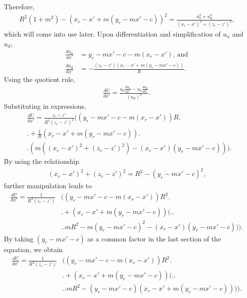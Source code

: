 Therefore,
\begin{align}\label{eqn:unsqplusudsq}
    R^2\left(1+m^2\right)-\left(x_r-x'+m\left(y_r-mx'-c\right)\right)^2 = \frac{u_n^2+u_d^2}{\left(x_r-x'\right)^2+\left(z_r-z'\right)^2} \text{,}
\end{align}
which will come into use later. Upon differentiation and simplification of \(u_n\) and \(u_d\),
\begin{align}
    \frac{du_n}{dx'} &= y_r - mx' - c - m\left(x_r-x'\right) \text{, and} \nonumber \\
    \frac{du_d}{dx'} &= -\frac{\left(z_r-z'\right)\left(x_r-x' + m\left(y_r-mx'-c\right)\right)}{R} \text{.}
\end{align}
Using the quotient rule,
\begin{align}
    \frac{dU}{dx'} = \frac{u_d\frac{du_n}{dx'} - u_n\frac{du_d}{dx'}}{\left(u_d\right)^2} \text{.}
\end{align}
Substituting in expressions,
\begin{align}
    &\frac{dU}{dx'} = \frac{z_r-z'}{R^2\left(z_r-z'\right)^2} \bigg(  \left(y_r-mx'-c-m\left(x_r-x'\right)\right)R \bigg. \nonumber \\
    & \bigg. +\frac{1}{R} \left( x_r - x' + m\left(y_r-mx'-c\right)\right)\bigg. \nonumber \\
    & \bigg. \left(m\left(\left(x_r-x'\right)^2 + \left(z_r-z'\right)^2\right) - \left(x_r-x'\right)\left(y_r-mx'-c\right)\right) \bigg) \text{.}
\end{align}
By using the relationship
\begin{align}
    \left(x_r-x'\right)^2+\left(z_r-z'\right)^2 = R^2 - \left(y_r-mx'-c\right)^2 \text{,}
\end{align}
further manipulation leads to
\begin{align}
    \frac{dU}{dx'} = \frac{1}{R^3\left(z_r-z'\right)} &\bigg( \left(y_r-mx'-c-m\left(x_r-x'\right)\right)R^2 \bigg. \nonumber \\
    & \bigg. + \left( x_r - x' + m\left(y_r-mx'-c\right)\right)\big( \big. \bigg. \nonumber \\
    & \bigg. \big. mR^2 - m\left(y_r-mx'-c\right)^2 - \left(x_r-x'\right)\left(y_r-mx'-c\right)\big) \bigg) \text{.}
\end{align}
By taking \(\left(y_r-mx'-c\right)\) as a common factor in the last section of the equation, we obtain
\begin{align}
    \frac{dU}{dx'} = \frac{1}{R^3\left(z_r-z'\right)} &\bigg( \left(y_r-mx'-c-m\left(x_r-x'\right)\right)R^2 \bigg. \nonumber \\
    & \bigg. + \left( x_r - x' + m\left(y_r-mx'-c\right)\right)\big( \big. \bigg. \nonumber \\
    & \bigg. \big. mR^2 - \left(y_r-mx'-c\right)\left(x_r-x'+m\left(y_r-mx'-c\right)\right)\big) \bigg) \text{.}
\end{align}
